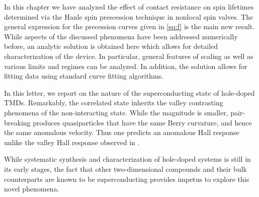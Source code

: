 In this chapter we have analyzed the effect of contact resistance
on spin lifetimes determined via the Hanle spin prescession technique
in nonlocal spin valves.
The general expression for the precession curves given
in \cref{eq:f} is the main new result.
While aspects of the discussed phenomena have been addressed numerically before,
an analytic solution is obtained here
which allows for detailed characterization of the device.
In particular, general features of scaling
as well as various limits and regimes can be analyzed.
In addition, the solution allows for fitting data
using standard curve fitting algorithms.

In this letter, we report on the nature of the superconducting state
of hole-doped TMDs.
Remarkably, the correlated state inherits
the valley contrasting phenomena of the non-interacting state.
While the magnitude is smaller, pair-breaking produces quasiparticles
that have the same Berry curvature, and hence the same anomalous velocity.
Thus one predicts an anomalous Hall response unlike the valley Hall response
observed in .

While systematic synthesis and characterization of hole-doped systems
is still in its early stages, the fact that other two-dimensional compounds
and their bulk counterparts are known to be superconducting
\cite{%
  PhysRevB.88.054515%
}
provides impetus to explore this novel phenomena.
